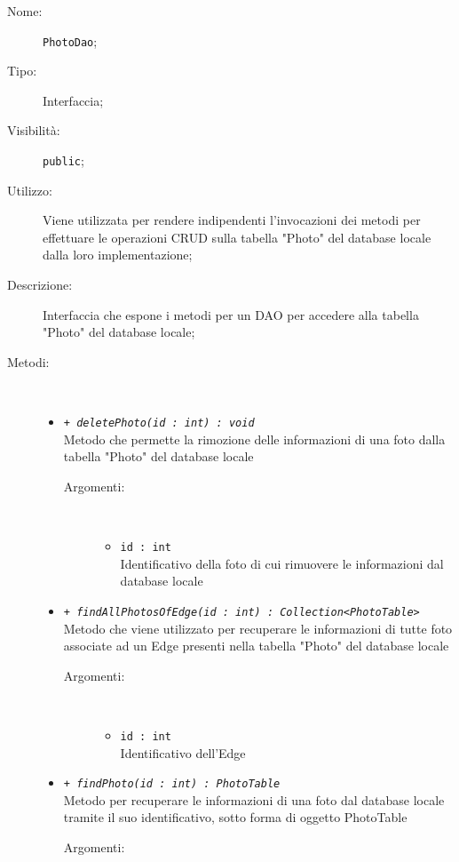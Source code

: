 \documentclass[../DefinizioneDiProdotto.tex]{subfiles}
\begin{document}
    \begin{description}
\item[Nome:] \texttt{PhotoDao};
\item[Tipo:] Interfaccia;
\item[Visibilità:] \texttt{public};
\item[Utilizzo:] Viene utilizzata per rendere indipendenti l'invocazioni dei metodi per effettuare le operazioni CRUD sulla tabella "Photo" del database locale dalla loro implementazione;
\item[Descrizione:] Interfaccia che espone i metodi per un DAO per accedere alla tabella "Photo" del database locale;
\item[Metodi:] \
\begin{itemize}
\item \texttt{+ \textit{deletePhoto(id : int) : void}}\\
Metodo che permette la rimozione delle informazioni di una foto dalla tabella "Photo" del database locale
 \begin{description}
\item[Argomenti:] \
\begin{itemize}
\item \texttt{id : int}\\
Identificativo della foto di cui rimuovere le informazioni dal database locale\end{itemize}
\end{description}
\item \texttt{+ \textit{findAllPhotosOfEdge(id : int) : Collection<PhotoTable>}}\\
Metodo che viene utilizzato per recuperare le informazioni di tutte foto associate ad un Edge presenti nella tabella "Photo" del database locale
 \begin{description}
\item[Argomenti:] \
\begin{itemize}
\item \texttt{id : int}\\
Identificativo dell'Edge\end{itemize}
\end{description}
\item \texttt{+ \textit{findPhoto(id : int) : PhotoTable}}\\
Metodo per recuperare le informazioni di una foto dal database locale tramite il suo identificativo, sotto forma di oggetto PhotoTable
 \begin{description}
\item[Argomenti:] \

\end{description}
\end{itemize}
\end{description}
\end{document}
